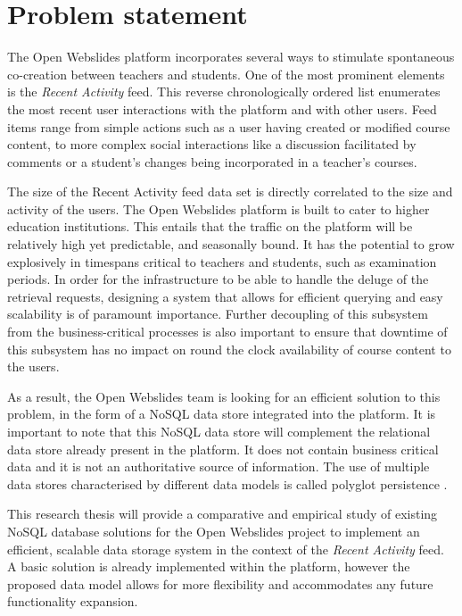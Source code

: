 \section{Problem statement}
\label{sec:problem-statement}

The Open Webslides platform incorporates several ways to stimulate spontaneous co-creation between teachers and students.
One of the most prominent elements is the \textit{Recent Activity} feed.
This reverse chronologically ordered list enumerates the most recent user interactions with the platform and with other users.
Feed items range from simple actions such as a user having created or modified course content, to more complex social interactions like a discussion facilitated by comments or a student's changes being incorporated in a teacher's courses.

The size of the Recent Activity feed data set is directly correlated to the size and activity of the users.
The Open Webslides platform is built to cater to higher education institutions.
This entails that the traffic on the platform will be relatively high yet predictable, and seasonally bound.
It has the potential to grow explosively in timespans critical to teachers and students, such as examination periods.
In order for the infrastructure to be able to handle the deluge of the retrieval requests, designing a system that allows for efficient querying and easy scalability is of paramount importance.
Further decoupling of this subsystem from the business-critical processes is also important to ensure that downtime of this subsystem has no impact on round the clock availability of course content to the users.

As a result, the Open Webslides team is looking for an efficient solution to this problem, in the form of a NoSQL data store integrated into the platform.
It is important to note that this NoSQL data store will complement the relational data store already present in the platform.
It does not contain business critical data and it is not an authoritative source of information.
The use of multiple data stores characterised by different data models is called polyglot persistence \autocite{Sadalage2012}.

This research thesis will provide a comparative and empirical study of existing NoSQL database solutions for the Open Webslides project to implement an efficient, scalable data storage system in the context of the \textit{Recent Activity} feed.
A basic solution is already implemented within the platform, however the proposed data model allows for more flexibility and accommodates any future functionality expansion.

